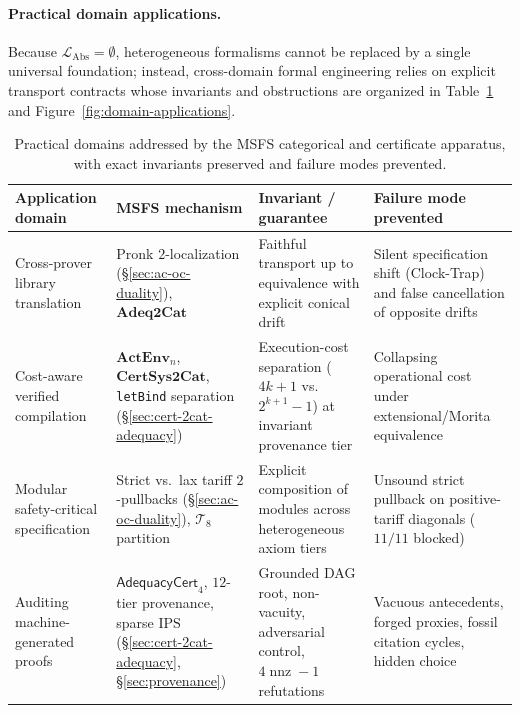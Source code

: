 \documentclass[11pt]{article}
\theoremstyle{plain}
\theoremstyle{definition}
\newcommand{\LAbs}{\mathcal{L}_{\mathrm{Abs}}}
\begin{document}
\paragraph{Practical domain applications.} Because $\LAbs = \emptyset$, heterogeneous formalisms cannot be replaced by a single universal foundation; instead, cross-domain formal engineering relies on explicit transport contracts whose invariants and obstructions are organized in Table~\ref{tab:domain-applications} and Figure~\ref{fig:domain-applications}.

\begin{table}[ht]
\centering
\caption{Practical domains addressed by the MSFS categorical and certificate apparatus, with exact invariants preserved and failure modes prevented.}
\label{tab:domain-applications}
\footnotesize
\begin{tabular}{@{}>{\RaggedRight\arraybackslash}p{3.25cm} >{\RaggedRight\arraybackslash}p{3.4cm} >{\RaggedRight\arraybackslash}p{3.8cm} >{\RaggedRight\arraybackslash}p{3.95cm}@{}}
\toprule
\textbf{Application \mbox{domain}} & \textbf{MSFS mechanism} & \textbf{Invariant / guarantee} & \textbf{Failure mode prevented} \\ \midrule
Cross-prover library translation & Pronk $2$-localization (\S\ref{sec:ac-oc-duality}), $\mathbf{Adeq2Cat}$ & Faithful transport up to equivalence with explicit conical drift & Silent specification shift (Clock-Trap) and false cancellation of opposite drifts \\ \addlinespace[3pt]
Cost-aware verified compilation & $\mathbf{ActEnv}_n$, $\mathbf{CertSys2Cat}$, \texttt{letBind} separation (\S\ref{sec:cert-2cat-adequacy}) & Execution-cost separation ($4k+1$ vs.\ $2^{k+1}-1$) at invariant provenance tier & Collapsing operational cost under extensional/Morita equivalence \\ \addlinespace[3pt]
Modular safety-critical specification & Strict vs.\ lax tariff $2$-pullbacks (\S\ref{sec:ac-oc-duality}), $\mathcal{T}_8$ partition & Explicit composition of modules across heterogeneous axiom tiers & Unsound strict pullback on positive-tariff diagonals ($11/11$ blocked) \\ \addlinespace[3pt]
Auditing machine-generated proofs & $\mathsf{AdequacyCert}_4$, $12$-tier provenance, sparse $\mathrm{IPS}$ (\S\ref{sec:cert-2cat-adequacy}, \S\ref{sec:provenance}) & Grounded DAG root, non-vacuity, adversarial control, $4\operatorname{nnz}-1$ refutations & Vacuous antecedents, forged proxies, fossil citation cycles, hidden choice \\ \bottomrule
\end{tabular}
\end{table}
\end{document}
